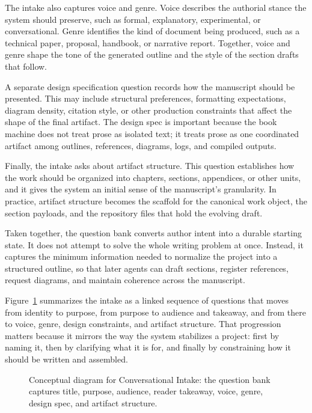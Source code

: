 \documentclass[11pt]{article}
\begin{document}
The intake also captures voice and genre. Voice describes the authorial stance the system should preserve, such as formal, explanatory, experimental, or conversational. Genre identifies the kind of document being produced, such as a technical paper, proposal, handbook, or narrative report. Together, voice and genre shape the tone of the generated outline and the style of the section drafts that follow.

A separate design specification question records how the manuscript should be presented. This may include structural preferences, formatting expectations, diagram density, citation style, or other production constraints that affect the shape of the final artifact. The design spec is important because the book machine does not treat prose as isolated text; it treats prose as one coordinated artifact among outlines, references, diagrams, logs, and compiled outputs.

Finally, the intake asks about artifact structure. This question establishes how the work should be organized into chapters, sections, appendices, or other units, and it gives the system an initial sense of the manuscript's granularity. In practice, artifact structure becomes the scaffold for the canonical work object, the section payloads, and the repository files that hold the evolving draft.

Taken together, the question bank converts author intent into a durable starting state. It does not attempt to solve the whole writing problem at once. Instead, it captures the minimum information needed to normalize the project into a structured outline, so that later agents can draft sections, register references, request diagrams, and maintain coherence across the manuscript.

Figure~\ref{fig:ch03_sec01_conversation_intake} summarizes the intake as a linked sequence of questions that moves from identity to purpose, from purpose to audience and takeaway, and from there to voice, genre, design constraints, and artifact structure. That progression matters because it mirrors the way the system stabilizes a project: first by naming it, then by clarifying what it is for, and finally by constraining how it should be written and assembled.

\begin{figure}[htbp]
\centering

\caption{Conceptual diagram for Conversational Intake: the question bank captures title, purpose, audience, reader takeaway, voice, genre, design spec, and artifact structure.}
\label{fig:ch03_sec01_conversation_intake}
\end{figure}
\end{document}
